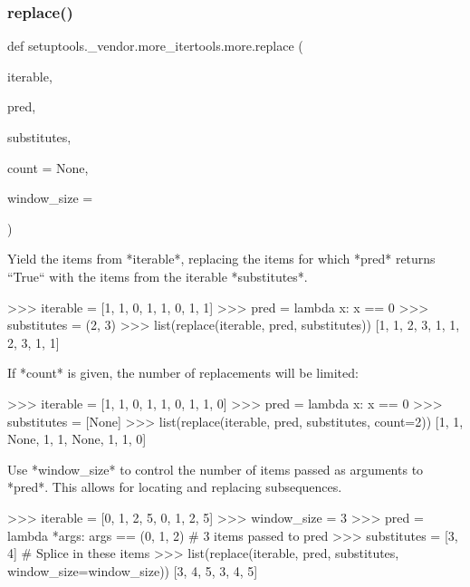 \subsubsection{\texorpdfstring{replace()}{replace()}}
{\footnotesize\ttfamily def setuptools.\+\_\+vendor.\+more\+\_\+itertools.\+more.\+replace (\begin{DoxyParamCaption}\item[{}]{iterable,  }\item[{}]{pred,  }\item[{}]{substitutes,  }\item[{}]{count = {\ttfamily None},  }\item[{}]{window\+\_\+size = {} }\end{DoxyParamCaption})}

\begin{DoxyVerb}Yield the items from *iterable*, replacing the items for which *pred*
returns ``True`` with the items from the iterable *substitutes*.

    >>> iterable = [1, 1, 0, 1, 1, 0, 1, 1]
    >>> pred = lambda x: x == 0
    >>> substitutes = (2, 3)
    >>> list(replace(iterable, pred, substitutes))
    [1, 1, 2, 3, 1, 1, 2, 3, 1, 1]

If *count* is given, the number of replacements will be limited:

    >>> iterable = [1, 1, 0, 1, 1, 0, 1, 1, 0]
    >>> pred = lambda x: x == 0
    >>> substitutes = [None]
    >>> list(replace(iterable, pred, substitutes, count=2))
    [1, 1, None, 1, 1, None, 1, 1, 0]

Use *window_size* to control the number of items passed as arguments to
*pred*. This allows for locating and replacing subsequences.

    >>> iterable = [0, 1, 2, 5, 0, 1, 2, 5]
    >>> window_size = 3
    >>> pred = lambda *args: args == (0, 1, 2)  # 3 items passed to pred
    >>> substitutes = [3, 4] # Splice in these items
    >>> list(replace(iterable, pred, substitutes, window_size=window_size))
    [3, 4, 5, 3, 4, 5]\end{DoxyVerb}
 \mbox{\label{namespacesetuptools_1_1__vendor_1_1more__itertools_1_1more_a7e085bda06138f196912d6300bf70753}} 
